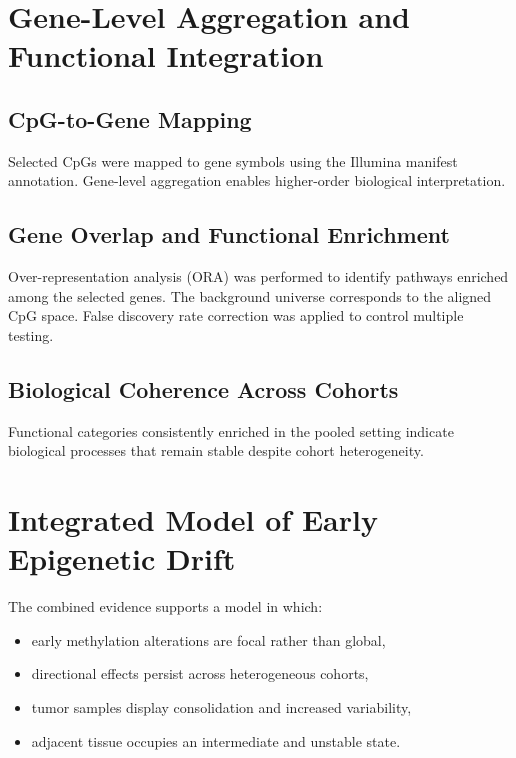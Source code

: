 \section{Gene-Level Aggregation and Functional Integration}

\subsection{CpG-to-Gene Mapping}

Selected CpGs were mapped to gene symbols
using the Illumina manifest annotation.
Gene-level aggregation enables higher-order
biological interpretation.

\subsection{Gene Overlap and Functional Enrichment}

Over-representation analysis (ORA) was performed
to identify pathways enriched among the selected genes.
The background universe corresponds to the aligned CpG space.
False discovery rate correction was applied
to control multiple testing.

\subsection{Biological Coherence Across Cohorts}

Functional categories consistently enriched
in the pooled setting
indicate biological processes that remain stable
despite cohort heterogeneity.

\section{Integrated Model of Early Epigenetic Drift}

The combined evidence supports a model in which:

\begin{itemize}
\item early methylation alterations are focal rather than global,
\item directional effects persist across heterogeneous cohorts,
\item tumor samples display consolidation and increased variability,
\item adjacent tissue occupies an intermediate and unstable state.
\end{itemize}

